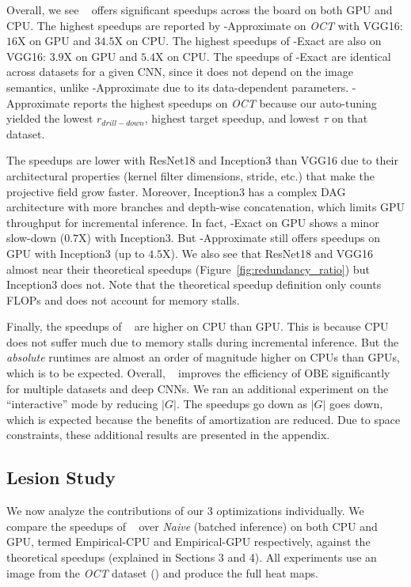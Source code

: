 Overall, we see \system~ offers significant speedups across the board on both GPU and CPU. The highest speedups are reported by \system-Approximate on \textit{OCT} with VGG16: $16$X on GPU and $34.5$X on CPU. The highest speedups of  \system-Exact are also on VGG16: $3.9$X on GPU and $5.4$X on CPU. The speedups of \system-Exact are identical across datasets for a given CNN, since it does not depend on the image semantics, unlike \system-Approximate due to its data-dependent parameters. \system-Approximate reports the highest speedups on \textit{OCT} because our auto-tuning yielded the lowest $r_{drill-down}$, highest target speedup, and lowest $\tau$ on that dataset. 

The speedups are lower with ResNet18 and Inception3 than VGG16 due to their architectural properties (kernel filter dimensions, stride, etc.) that make the projective field grow faster. Moreover, Inception3 has a complex DAG architecture with more branches and depth-wise concatenation, which limits GPU throughput for incremental inference. In fact, \system-Exact on GPU shows a minor slow-down ($0.7$X) with Inception3. But \system-Approximate still offers speedups on GPU with Inception3 (up to $4.5$X). We also see that ResNet18 and VGG16 almost near their theoretical speedups (Figure~\ref{fig:redundancy_ratio}) but Inception3 does not. Note that the theoretical speedup definition only counts FLOPs and does not account for memory stalls.

Finally, the speedups of \system~ are higher on CPU than GPU. This is because CPU does not suffer much due to memory stalls during incremental inference. But the \textit{absolute} runtimes are almost an order of magnitude higher on CPUs than GPUs, which is to be expected. Overall, \system~ improves the efficiency of OBE significantly for multiple datasets and deep CNNs. We ran an additional experiment on the ``interactive'' mode by reducing $|G|$. The speedups go down as $|G|$ goes down, which is expected because the benefits of amortization are reduced. Due to space constraints, these additional results are presented in the appendix.


\subsection{Lesion Study}
We now analyze the contributions of our 3 optimizations individually. We compare the speedups of \system~ over \textit{Naive} (batched inference) on both CPU and GPU, termed  Empirical-CPU and Empirical-GPU respectively, against the theoretical speedups (explained in Sections 3 and 4). All experiments use an image from the \textit{OCT} dataset () and produce the full heat maps.

